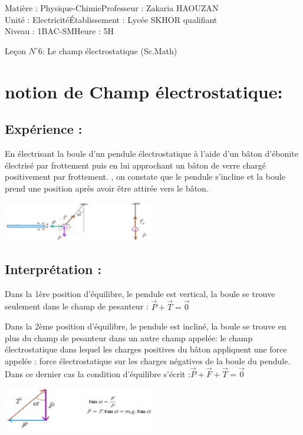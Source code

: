 \documentclass[12pt]{article}
\author{Zakaria HAOUZAN}
\date{\today}
\newcommand\headerMe[2]{\noindent{}#1\hfill#2}
\begin{document}
\headerMe{Matière : Physique-Chimie}{Professeur : Zakaria HAOUZAN}\\
\headerMe{Unité : Electricité}{Établissement : Lycée SKHOR qualifiant}\\
\headerMe{Niveau : 1BAC-SM}{Heure : 5H}\\

\begin{center}

    \Large{Leçon $N^{\circ} 6 $: \color{red}Le champ électrostatique (Sc.Math) }
\end{center}


\section{notion de Champ électrostatique:}
\subsection{Expérience :}
En électrisant la boule d’un pendule électrostatique à l’aide d’un bâton d’ébonite électrisé par frottement puis en lui approchant
un bâton de verre chargé positivement par frottement. , on constate que le pendule s’incline et la boule prend une position après avoir
être attirée vers le bâton.
\begin{center}
    \includegraphics[width=0.5\textwidth]{./img/img_00.png}
\end{center}
\subsection{Interprétation : }
Dans la 1ère position d’équilibre, le pendule est vertical, la boule se trouve seulement dans le champ de pesanteur : $\vec{P} + \vec{T} = \vec{0}$

Dans la 2ème position d’équilibre, le pendule est incliné, la boule se trouve en plus du champ de pesanteur dans un autre champ
appelée: le champ électrostatique dans lequel les charges positives du bâton appliquent une force appelée : force électrostatique
sur les charges négatives de la boule du pendule.
Dans ce dernier cas la condition d’équilibre s’écrit :$\vec{P} +\vec{F} + \vec{T} = \vec{0}$
\begin{center}
    \includegraphics[width=0.5\textwidth]{./img/img_01.png}
\end{center}
\end{document}
